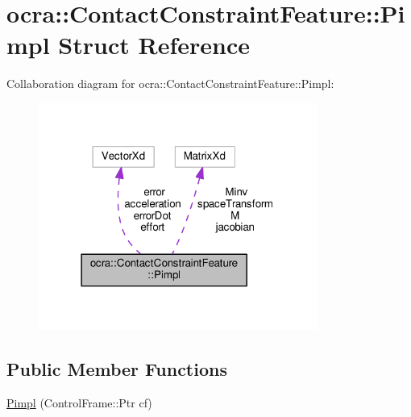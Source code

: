 \hypertarget{structocra_1_1ContactConstraintFeature_1_1Pimpl}{}\section{ocra\+:\+:Contact\+Constraint\+Feature\+:\+:Pimpl Struct Reference}
\label{structocra_1_1ContactConstraintFeature_1_1Pimpl}


Collaboration diagram for ocra\+:\+:Contact\+Constraint\+Feature\+:\+:Pimpl\+:
\nopagebreak
\begin{figure}[H]
\begin{center}
\leavevmode
\includegraphics[width=259pt]{d7/d6e/structocra_1_1ContactConstraintFeature_1_1Pimpl__coll__graph}
\end{center}
\end{figure}
\subsection*{Public Member Functions}
\begin{DoxyCompactItemize}
\item 
\hyperlink{structocra_1_1ContactConstraintFeature_1_1Pimpl_a59ec46b69968b06c7e858234acccd990}{Pimpl} (Control\+Frame\+::\+Ptr cf)
\end{DoxyCompactItemize}
